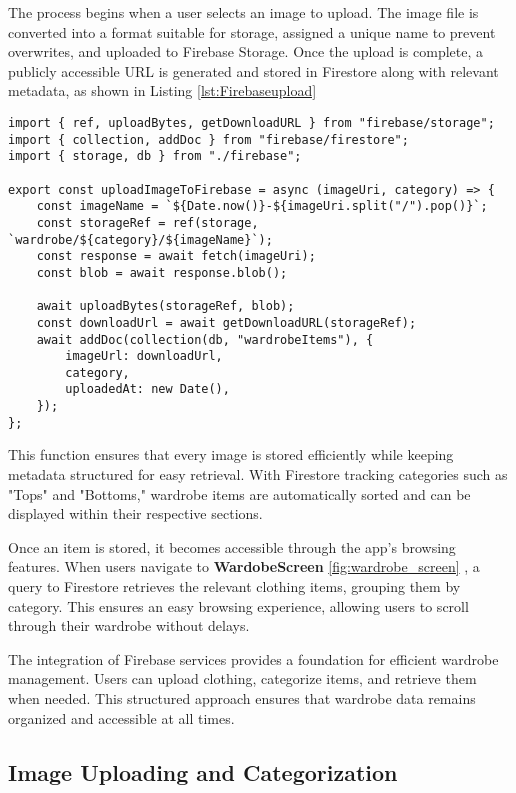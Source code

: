 The process begins when a user selects an image to upload. The image file is converted into a format suitable for storage, assigned a unique name to prevent overwrites, and uploaded to Firebase Storage. Once the upload is complete, a publicly accessible URL is generated and stored in Firestore along with relevant metadata, as shown in Listing \ref{lst:Firebaseupload}
\begin{lstlisting}[caption={Storing images and metadata in \texttt{Firebaseupload.js}},label=lst:Firebaseupload]
import { ref, uploadBytes, getDownloadURL } from "firebase/storage";
import { collection, addDoc } from "firebase/firestore";
import { storage, db } from "./firebase";

export const uploadImageToFirebase = async (imageUri, category) => {
    const imageName = `${Date.now()}-${imageUri.split("/").pop()}`;
    const storageRef = ref(storage, `wardrobe/${category}/${imageName}`);
    const response = await fetch(imageUri);
    const blob = await response.blob();

    await uploadBytes(storageRef, blob);
    const downloadUrl = await getDownloadURL(storageRef);
    await addDoc(collection(db, "wardrobeItems"), {
        imageUrl: downloadUrl,
        category,
        uploadedAt: new Date(),
    });
};
\end{lstlisting}

This function ensures that every image is stored efficiently while keeping metadata structured for easy retrieval. With Firestore tracking categories such as "Tops" and "Bottoms," wardrobe items are automatically sorted and can be displayed within their respective sections.

Once an item is stored, it becomes accessible through the app’s browsing features. When users navigate to \textbf{WardobeScreen} \ref{fig:wardrobe_screen} , a query to Firestore retrieves the relevant clothing items, grouping them by category. This ensures an easy browsing experience, allowing users to scroll through their wardrobe without delays.

The integration of Firebase services provides a foundation for efficient wardrobe management. Users can upload clothing, categorize items, and retrieve them when needed. This structured approach ensures that wardrobe data remains organized and accessible at all times.


\subsection{Image Uploading and Categorization}

